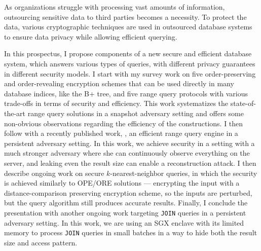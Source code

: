 As organizations struggle with processing vast amounts of information, outsourcing sensitive data to third parties becomes a necessity.
To protect the data, various cryptographic techniques are used in outsourced database systems to ensure data privacy while allowing efficient querying.

In this prospectus, I propose components of a new secure and efficient database system, which answers various types of queries, with different privacy guarantees in different security models.
I start with my survey work on five order-preserving and order-revealing encryption schemes that can be used directly in many database indices, like the B+ tree, and five range query protocols with various trade-offs in terms of security and efficiency.
This work systematizes the state-of-the-art range query solutions in a snapshot adversary setting and offers some non-obvious observations regarding the efficiency of the constructions.
I then follow with a recently published work, \epsolute{}, an efficient range query engine in a persistent adversary setting.
In this work, we achieve security in a setting with a much stronger adversary where she can continuously observe everything on the server, and leaking even the result size can enable a reconstruction attack.
I then describe ongoing work on secure $k$-nearest-neighbor queries, in which the security is achieved similarly to OPE/ORE solutions --- encrypting the input with a distance-comparison preserving encryption scheme, so the inputs are perturbed, but the query algorithm still produces accurate results.
Finally, I conclude the presentation with another ongoing work targeting \texttt{JOIN} queries in a persistent adversary setting.
In this work, we are using an SGX enclave with its limited memory to process \texttt{JOIN} queries in small batches in a way to hide both the result size and access pattern.

